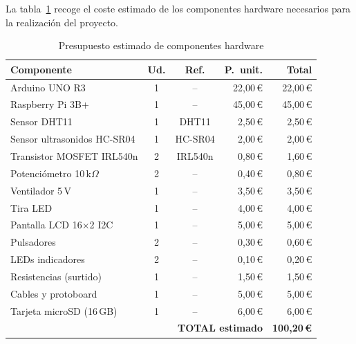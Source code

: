 \documentclass[12pt, a4paper]{article}
\begin{document}
La tabla~\ref{tab:presupuesto} recoge el coste estimado de los componentes hardware
necesarios para la realización del proyecto.

\begin{table}[H]
    \centering
    \caption{Presupuesto estimado de componentes hardware}
    \label{tab:presupuesto}
    \renewcommand{\arraystretch}{1.3}
    \begin{tabularx}{\textwidth}{X c c r r}
        \toprule
        \textbf{Componente}           & \textbf{Ud.} & \textbf{Ref.}   & \textbf{P.\ unit.} & \textbf{Total} \\
        \midrule
        Arduino UNO R3                & 1  & --          & 22,00\,€  & 22,00\,€ \\
        Raspberry Pi 3B+              & 1  & --          & 45,00\,€  & 45,00\,€ \\
        Sensor DHT11                  & 1  & DHT11       &  2,50\,€  &  2,50\,€ \\
        Sensor ultrasonidos HC-SR04   & 1  & HC-SR04     &  2,00\,€  &  2,00\,€ \\
        Transistor MOSFET IRL540n     & 2  & IRL540n     &  0,80\,€  &  1,60\,€ \\
        Potenciómetro 10\,k$\Omega$   & 2  & --          &  0,40\,€  &  0,80\,€ \\
        Ventilador 5\,V               & 1  & --          &  3,50\,€  &  3,50\,€ \\
        Tira LED                      & 1  & --          &  4,00\,€  &  4,00\,€ \\
        Pantalla LCD 16$\times$2 I2C  & 1  & --          &  5,00\,€  &  5,00\,€ \\
        Pulsadores                    & 2  & --          &  0,30\,€  &  0,60\,€ \\
        LEDs indicadores              & 2  & --          &  0,10\,€  &  0,20\,€ \\
        Resistencias (surtido)        & 1  & --          &  1,50\,€  &  1,50\,€ \\
        Cables y protoboard           & 1  & --          &  5,00\,€  &  5,00\,€ \\
        Tarjeta microSD (16\,GB)      & 1  & --          &  6,00\,€  &  6,00\,€ \\
        \midrule
        \multicolumn{4}{r}{\textbf{TOTAL estimado}}                   & \textbf{100,20\,€} \\
        \bottomrule
    \end{tabularx}
\end{table}
\end{document}
